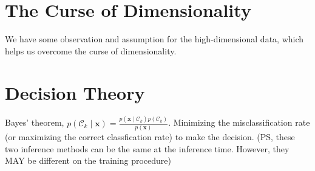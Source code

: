 \documentclass{article}
\begin{document}


\section{The Curse of Dimensionality}
We have some observation and assumption for the high-dimensional data, which helps us overcome the curse of dimensionality.


\section{Decision Theory}
Bayes’ theorem, $
p\left(\mathcal{C}_{k} \mid \mathbf{x}\right)=\frac{p\left(\mathbf{x} \mid \mathcal{C}_{k}\right) p\left(\mathcal{C}_{k}\right)}{p(\mathbf{x})}
$.
Minimizing the misclassiﬁcation rate (or maximizing the correct classfication rate) to make the decision.
(PS, these two inference methods can be the same at the inference time.  However, they MAY be different on the training procedure)
\end{document}
